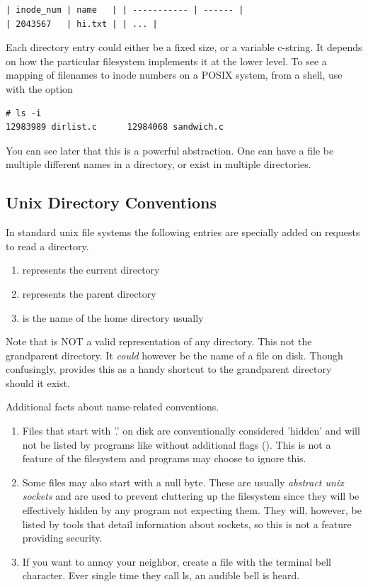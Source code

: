 \begin{verbatim}
| inode_num | name   | | ----------- | ------ |
| 2043567   | hi.txt | | ... |
\end{verbatim}

Each directory entry could either be a fixed size, or a variable c-string.
It depends on how the particular filesystem implements it at the lower level.
To see a mapping of filenames to inode numbers on a POSIX system, from a shell, use  with the  option

\begin{verbatim}
# ls -i
12983989 dirlist.c      12984068 sandwich.c
\end{verbatim}

You can see later that this is a powerful abstraction.
One can have a file be multiple different names in a directory, or exist in multiple directories.

\subsection{Unix Directory Conventions}

In standard unix file systems the following entries are specially added on requests to read a directory.

\begin{enumerate}
  \item {} represents the current directory
  \item {} represents the parent directory
  \item \keyword{~~} is the name of the home directory usually
\end{enumerate}

Note that  is NOT a valid representation of any directory.
This not the grandparent directory.
It \emph{could} however be the name of a file on disk.
Though confusingly,  provides this as a handy shortcut to the grandparent directory should it exist.

Additional facts about name-related conventions.

\begin{enumerate}
\item Files that start with '.' on disk are conventionally considered 'hidden' and will not be listed by programs like  without additional flags ().
  This is not a feature of the filesystem and programs may choose to ignore this.
\item Some files may also start with a null byte.
  These are usually \emph{abstract unix sockets} and are used to prevent cluttering up the filesystem since they will be effectively hidden by any program not expecting them.
  They will, however, be listed by tools that detail information about sockets, so this is not a feature providing security.
\item If you want to annoy your neighbor, create a file with the terminal bell character. Ever single time they call ls, an audible bell is heard.
\end{enumerate}

